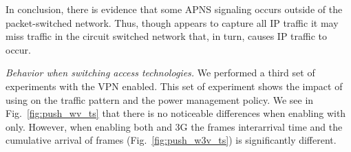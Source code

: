 In conclusion, there is evidence that some APNS signaling occurs 
outside of the packet-switched network. Thus, though \meddle appears 
to capture all IP traffic it may miss traffic in the circuit switched network 
that, in turn, causes IP traffic to occur.






\emph{Behavior when switching access technologies.} We performed a third set of experiments with the VPN enabled. This set
of experiment shows the impact of using \meddle on the traffic pattern
and the power management policy. We see in
Fig.~\ref{fig:push_wv_ts} that
there is no noticeable differences when enabling \meddle with \wifi{} only. However,
when enabling both \wifi and 3G the frames interarrival time
and the cumulative arrival of frames
(Fig.~\ref{fig:push_w3v_ts}) is significantly different. 

